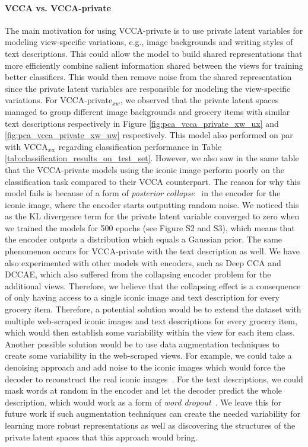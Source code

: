 \vspace{-3mm}
\paragraph{VCCA vs. VCCA-private} The main motivation for using VCCA-private is to use private latent variables for modeling view-specific variations, e.g., image backgrounds and writing styles of text descriptions. This could allow the model to build shared representations that more efficiently combine salient information shared between the views for training better classifiers. This would then remove noise from the shared representation since the private latent variables are responsible for modeling the view-specific variations. For VCCA-private$_{x w}$, we observed that the private latent spaces managed to group different image backgrounds and grocery items with similar text descriptions respectively in Figure \ref{fig:pca_vcca_private_xw_ux} and \ref{fig:pca_vcca_private_xw_uw} respectively. This model also performed on par with VCCA$_{x w}$ regarding classification performance in Table \ref{tab:classification_results_on_test_set}. However, we also saw in the same table that the VCCA-private models using the iconic image perform poorly on the classification task compared to their VCCA counterpart. The reason for why this model fails is because of a form of \textit{posterior collapse}~ in the encoder for the iconic image, where the encoder starts outputting random noise. We noticed this as the KL divergence term for the private latent variable converged to zero when we trained the models for 500 epochs (see Figure S2 and S3), which means that the encoder outputs a distribution which equals a Gaussian prior. The same phenomenon occurs for VCCA-private with the text description as well. We have also experimented with other models with encoders, such as Deep CCA and DCCAE, which also suffered from the collapsing encoder problem for the additional views. Therefore, we believe that the collapsing effect is a consequence of only having access to a single iconic image and text description for every grocery item. Therefore, a potential solution would be to extend the dataset with multiple web-scraped iconic images and text descriptions for every grocery item, which would then establish some variability within the view for each item class. Another possible solution would be to use data augmentation techniques to create some variability in the web-scraped views. For example, we could take a denoising approach and add noise to the iconic images which would force the decoder to reconstruct the real iconic images~. For the text descriptions, we could mask words at random in the encoder and let the decoder predict the whole description, which would work as a form of \textit{word dropout}~. We leave this for future work if such augmentation techniques can create the needed variability for learning more robust representations as well as discovering the structures of the private latent spaces that this approach would bring. 

